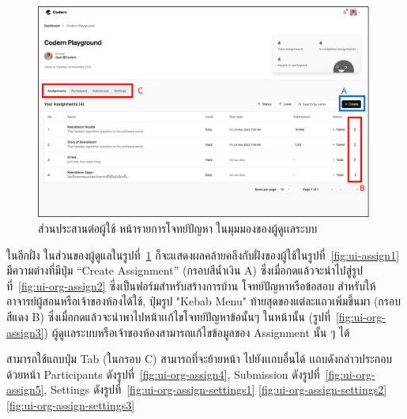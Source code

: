 \documentclass[12pt,oneside,openright,a4paper]{cpe-thai-project}
\begin{document}
    \hypertarget{ui-org-assign1}{
        \begin{figure}[H]
        \centering
            \includegraphics[width=15cm]{figure/ui/ui-assign2.png}
            \caption[ส่วนประสานต่อผู้ใช้ หน้ารายการโจทย์ปัญหาของผู้ดูเเลระบบ]{ส่วนประสานต่อผู้ใช้ หน้ารายการโจทย์ปัญหา ในมุมมองของผู้ดูเเลระบบ}
            \label{fig:ui-org-assign1}
        \end{figure}
    }

    \begin{flushleft}
    ในอีกฝั่ง ในส่วนของผู้ดูแลในรูปที่~\ref{fig:ui-org-assign1} ก็จะแสดงผลคล้ายคลึงกับฝั่งของผู้ใช้ในรูปที่~\ref{fig:ui-assign1} มีความต่างที่มีปุ่ม “Create Assignment” (กรอบสีน้ำเงิน A) ซึ่งเมื่อกดแล้วจะนำไปสู่รูปที่~\ref{fig:ui-org-assign2} ซึ่งเป็นฟอร์มสำหรับสร้างการบ้าน โจทย์ปัญหาหรือข้อสอบ สำหรับให้อาจารย์ผู้สอนหรือเจ้าของห้องได้ใช้, ปุ่มรูป "Kebab Menu" ท้ายสุดของแต่ละแถวเพิ่มขึ้นมา (กรอบสีแดง B) ซึ่งเมื่อกดแล้วจะนำพาไปหน้าเเก้ไขโจทย์ปัญหาข้อนั้นๆ ในหน้านั้น (รูปที่~\ref{fig:ui-org-assign3}) ผู้ดูเเลระบบหรือเจ้าของห้องสามารถแก้ไขข้อมูลของ Assignment นั้น ๆ ได้ 
    \end{flushleft}
    
    \begin{flushleft}
    สามารถใช้แถบปุ่ม Tab (ในกรอบ C) สามารถที่จะย้ายหน้า ไปยังเเถบอื่นได้ เเถบดังกล่าวประกอบด้วยหน้า Participants ดังรูปที่~\ref{fig:ui-org-assign4}, Submission ดังรูปที่~\ref{fig:ui-org-assign5}, Settings ดังรูปที่~\ref{fig:ui-org-assign-settings1} \ref{fig:ui-org-assign-settings2} \ref{fig:ui-org-assign-settings3}
    \end{flushleft}

    \pagebreak
\end{document}
